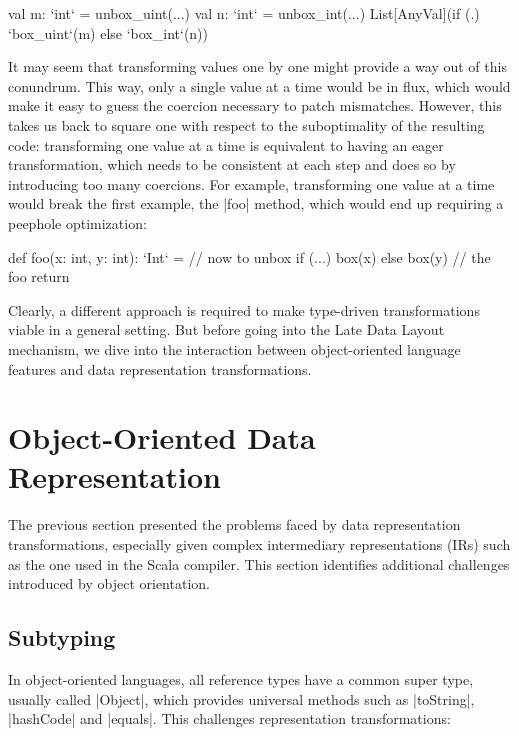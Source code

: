 \begin{lstlisting-nobreak}
 val m: `int` = unbox_uint(...)
 val n: `int` = unbox_int(...)
 List[AnyVal](if (.) `box_uint`(m) else `box_int`(n))
\end{lstlisting-nobreak}

It may seem that transforming values one by one might provide a way out of this conundrum. This way, only a single value at a time would be in flux, which would make it easy to guess the coercion necessary to patch mismatches. However, this takes us back to square one with respect to the suboptimality of the resulting code: transforming one value at a time is equivalent to having an eager transformation, which needs to be consistent at each step and does so by introducing too many coercions. For example, transforming one value at a time would break the first example, the |foo| method, which would end up requiring a peephole optimization:

\begin{lstlisting-nobreak}
 def foo(x: int, y: int): `Int` = // now to unbox
   if (...) box(x) else box(y) // the foo return
\end{lstlisting-nobreak}

Clearly, a different approach is required to make type-driven transformations viable in a general setting. But before going into the Late Data Layout mechanism, we dive into the interaction between object-oriented language features and data representation transformations.

\section{Object-Oriented Data Representation}
\label{ldl:sec:problem-oo}

The previous section presented the problems faced by data representation transformations, especially given complex intermediary representations (IRs) such as the one used in the Scala compiler. This section identifies additional challenges introduced by object orientation.

\subsection{Subtyping}

\label{ldl:sec:problem-oo/subtyping}
In object-oriented languages, all reference types have a common super type, usually called |Object|, which provides universal methods such as |toString|, |hashCode| and |equals|. This challenges representation transformations:

